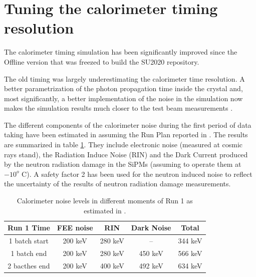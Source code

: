 
\section{Tuning the calorimeter timing resolution}

The calorimeter timing simulation has been significantly improved since the Offline version that was freezed to build the SU2020 repository.

The old timing was largely underestimating the calorimeter time resolution. A better parametrization of the photon propagation time inside the crystal and, most significantly, a better implementation of the noise in the simulation now makes the simulation results much closer to the test beam measurements \cite{MU2E_35540_CALO_TIMING}.

The different components of the calorimeter noise during the first period of data taking have been estimated in \cite{MU2E_35519_CALO_NOISE} assuming the Run Plan reported in \cite{MU2E_33731_RUN1_PLAN}. The results are summarized in table \ref{table:calonoise}. They include electronic noise (measured at cosmic rays stand), the Radiation Induce Noise (RIN) and the Dark Current produced by the neutron radiation damage in the SiPMs (assuming to operate them at $-10^o$ C). A safety factor 2 has been used for the neutron induced noise to reflect the uncertainty of the results of neutron radiation damage measurements.

\begin{table}[htbp]
  \begin{center} 
    \begin{tabular}{|c|c|c|c|c|}
      \hline
      Run 1 Time        & FEE noise  & RIN     &  Dark Noise & Total    \\ 
      \hline
      1 batch start     & 200 keV    & 280 keV &  --         & 344 keV  \\
      1 batch end       & 200 keV    & 280 keV &  450 keV    & 566 keV  \\
      2 bacthes end     & 200 keV    & 400 keV &  492 keV    & 634 keV  \\
      \hline
    \end{tabular}
  \end{center}
  \caption{
  \label{table:calonoise}
    Calorimeter noise levels in different moments of Run 1 as estimated in \cite{MU2E_35519_CALO_NOISE}.
  }
\end{table}

